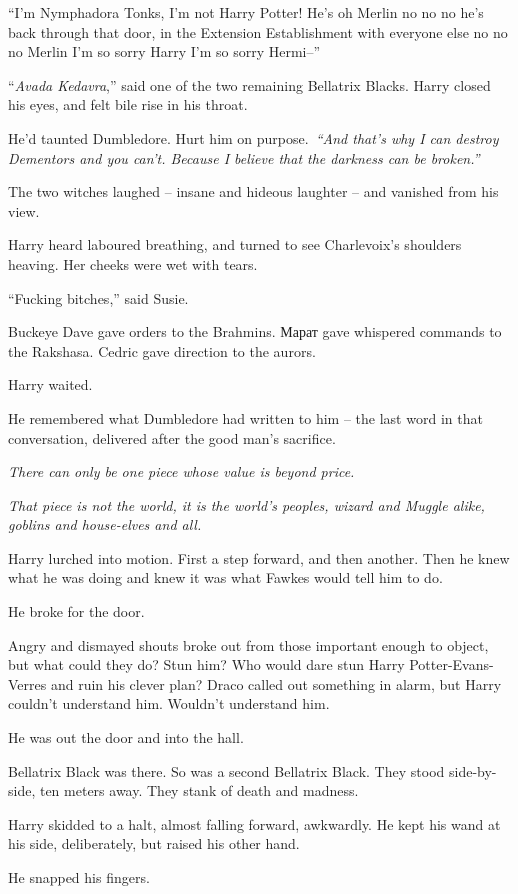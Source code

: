``I'm Nymphadora Tonks, I'm not Harry Potter! He's oh Merlin no no no
he's back through that door, in the Extension Establishment with
everyone else no no no Merlin I'm so sorry Harry I'm so sorry Hermi--''

``\emph{Avada Kedavra},'' said one of the two remaining Bellatrix
Blacks. Harry closed his eyes, and felt bile rise in his throat.

He'd taunted Dumbledore. Hurt him on purpose.~\emph{``And that's why I
can destroy Dementors and you can't. Because I believe that the darkness
can be broken.''}

The two witches laughed -- insane and hideous laughter -- and vanished
from his view.

Harry heard laboured breathing, and turned to see Charlevoix's shoulders
heaving. Her cheeks were wet with tears.

``Fucking bitches,'' said Susie.

Buckeye Dave gave orders to the Brahmins. Марат gave whispered commands
to the Rakshasa. Cedric gave direction to the aurors.

Harry waited.

He remembered what Dumbledore had written to him -- the last word in
that conversation, delivered after the good man's sacrifice.

\emph{There can only be one piece whose value is beyond price.}

\emph{That piece is not the world, it is the world's peoples, wizard and
Muggle alike, goblins and house-elves and all.}

Harry lurched into motion. First a step forward, and then another. Then
he knew what he was doing and knew it was what Fawkes would tell him to
do.

He broke for the door.

Angry and dismayed shouts broke out from those important enough to
object, but what could they do? Stun him? Who would dare stun Harry
Potter-Evans-Verres and ruin his clever plan? Draco called out something
in alarm, but Harry couldn't understand him. Wouldn't understand him.

He was out the door and into the hall.

Bellatrix Black was there. So was a second Bellatrix Black. They stood
side-by-side, ten meters away. They stank of death and madness.

Harry skidded to a halt, almost falling forward, awkwardly. He kept his
wand at his side, deliberately, but raised his other hand.

He snapped his fingers.
